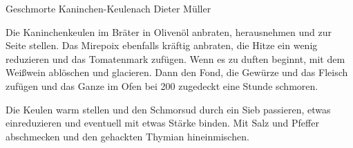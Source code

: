\begin{recipe}{Geschmorte Kaninchen-Keule}{nach Dieter Müller}
  \inglist
  
  \steps
  Die Kaninchenkeulen im Bräter in Olivenöl anbraten, herausnehmen und zur Seite stellen.
  Das Mirepoix ebenfalls kräftig anbraten, die Hitze ein wenig reduzieren und das
  Tomatenmark zufügen. Wenn es zu duften beginnt, mit dem Weißwein ablöschen und
  glacieren. Dann den Fond, die Gewürze und das Fleisch zufügen und das Ganze im Ofen bei
  200 \celsius zugedeckt eine Stunde schmoren.

  Die Keulen warm stellen und den Schmorsud durch ein Sieb passieren, etwas einreduzieren
  und eventuell mit etwas Stärke binden. Mit Salz und Pfeffer abschmecken und den
  gehackten Thymian hineinmischen.
\end{recipe}
